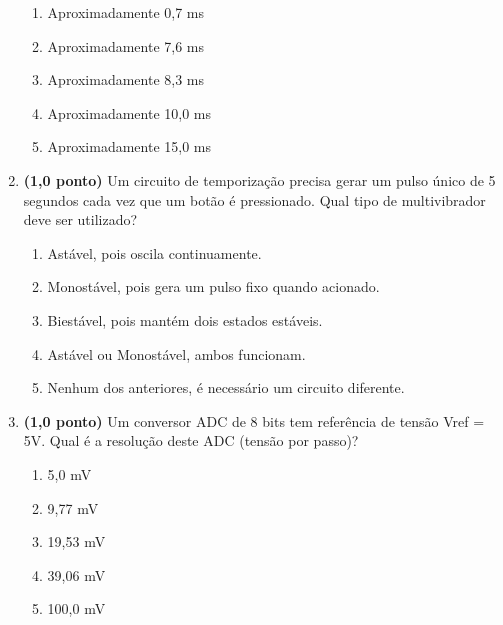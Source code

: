 \documentclass[a4paper,12pt]{article}
\begin{document}
\begin{multicols}{2}
\begin{enumerate}[leftmargin=*]
\begin{enumerate}[label=(\Alph*)]
    \item Aproximadamente 0,7 ms
    \item Aproximadamente 7,6 ms
    \item Aproximadamente 8,3 ms
    \item Aproximadamente 10,0 ms
    \item Aproximadamente 15,0 ms
\end{enumerate}

\vspace{0.2cm}


\item \textbf{(1,0 ponto)} Um circuito de temporização precisa gerar um pulso único de 5 segundos cada vez que um botão é pressionado. Qual tipo de multivibrador deve ser utilizado?

\begin{enumerate}[label=(\Alph*)]
    \item Astável, pois oscila continuamente.
    \item Monostável, pois gera um pulso fixo quando acionado.
    \item Biestável, pois mantém dois estados estáveis.
    \item Astável ou Monostável, ambos funcionam.
    \item Nenhum dos anteriores, é necessário um circuito diferente.
\end{enumerate}

\vspace{0.2cm}


\item \textbf{(1,0 ponto)} Um conversor ADC de 8 bits tem referência de tensão Vref = 5V. Qual é a resolução deste ADC (tensão por passo)?

\begin{enumerate}[label=(\Alph*)]
    \item 5,0 mV
    \item 9,77 mV
    \item 19,53 mV
    \item 39,06 mV
    \item 100,0 mV
\end{enumerate}


\end{enumerate}
\end{multicols}
\end{document}
